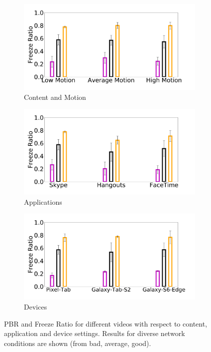 \begin{figure}
     \begin{subfigure}[b]{0.33\textwidth}
        \centering
        \includegraphics[width=1\linewidth]{sections/network-work/content-stutter}
        \caption{Content and Motion}
    \end{subfigure}
    \begin{subfigure}[b]{0.33\textwidth}
        \centering
        \includegraphics[width=1\linewidth]{sections/network-work/app-stutter}
        \caption{Applications}
    \end{subfigure}%
    \begin{subfigure}[b]{0.33\textwidth}
        \centering
        \includegraphics[width=1\linewidth]{sections/network-work/dev-stutter}
        \caption{Devices}
    \end{subfigure}
    \caption{PBR and Freeze Ratio for different videos with respect to content, application and device settings. Results for diverse network conditions are shown (from bad, average, good).}
     \label{fig:measurements}
     \vspace*{-1em}
\end{figure}

